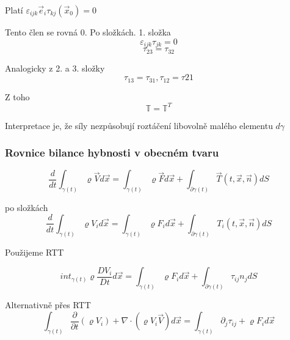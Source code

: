 \documentclass[../main.tex]{subfiles}
\begin{document}
Platí 
$\varepsilon_{ijk} \vec{e}_i \tau_{kj} (\vec{x}_0) = 0$

Tento člen se rovná 0. Po složkách. 1. složka
\begin{equation}
    \varepsilon_{ijk}\tau_{jk} = 0
\end{equation}
\begin{equation}
    \tau_{23} = \tau_{32}
\end{equation}

Analogicky z 2. a 3. složky
\begin{equation}
    \tau_{13} = \tau_{31}, \tau_{12} = \tau{21}
\end{equation}

Z toho 
\begin{equation}
    \mathbb{T} = \mathbb{T}^T
\end{equation}

Interpretace je, že síly nezpůsobují roztáčení libovolně malého elementu $d\gamma$


\subsubsection{Rovnice bilance hybnosti v obecném tvaru}

\begin{equation}
    \frac{d}{dt} \int_{\gamma(t)} \varrho \vec{V} d\vec{x} = \int_{\gamma(t)} \varrho \vec{F} d\vec{x} + \int_{\partial \gamma (t)}  \vec{T}(t,\vec{x}, \vec{n}) dS 
\end{equation}

po složkách
\begin{equation}
    \frac{d}{dt} \int_{\gamma(t)} \varrho V_i d\vec{x} = \int_{\gamma(t)} \varrho F_i d\vec{x} + \int_{\partial \gamma (t)}  T_i(t,\vec{x}, \vec{n}) dS 
\end{equation}

Použijeme RTT 

\begin{equation}
    int_{\gamma(t)} \varrho \frac{D V_i}{Dt} d\vec{x} = \int_{\gamma(t)} \varrho F_i d\vec{x} + \int_{\partial \gamma (t)}  \tau_{ij} n_j dS 
\end{equation}


Alternativně přes RTT
\begin{equation}
    \int_{\gamma(t)} \frac{\partial}{\partial t} (\varrho V_i) + \nabla \cdot (\varrho V_i \vec{V}) d\vec{x} = \int_{\gamma(t)} \partial_j \tau_{ij} + \varrho F_i d\vec{x}
\end{equation}
\end{document}

